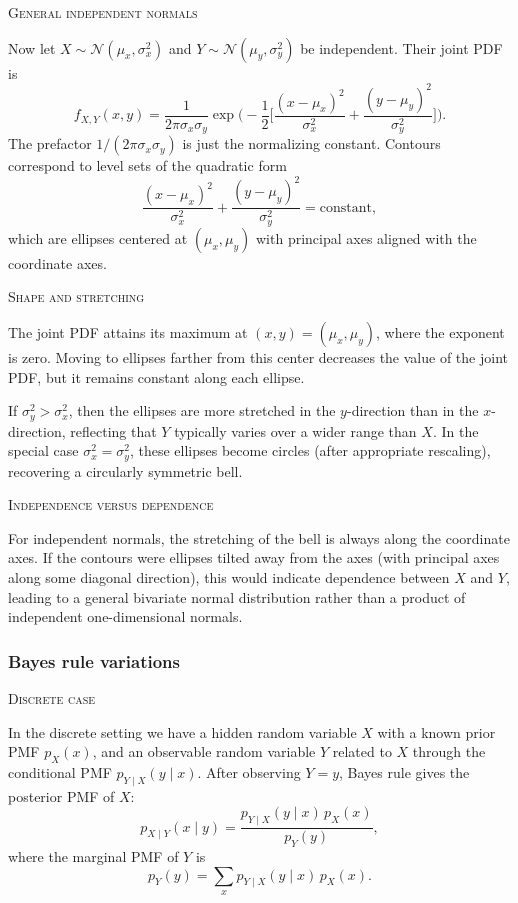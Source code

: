 \textsc{General independent normals}

Now let \(X\sim\mathcal{N}(\mu_{x},\sigma_{x}^{2})\) and \(Y\sim\mathcal{N}(\mu_{y},\sigma_{y}^{2})\) be independent.  
Their joint PDF is
\[
f_{X,Y}(x,y)
=
\frac{1}{2\pi\sigma_{x}\sigma_{y}}
\exp\!\Bigg(
-\frac{1}{2}\Bigg[
\frac{(x-\mu_{x})^{2}}{\sigma_{x}^{2}}
+
\frac{(y-\mu_{y})^{2}}{\sigma_{y}^{2}}
\Bigg]
\Bigg).
\]
The prefactor \(1/(2\pi\sigma_{x}\sigma_{y})\) is just the normalizing constant.  
Contours correspond to level sets of the quadratic form
\[
\frac{(x-\mu_{x})^{2}}{\sigma_{x}^{2}}
+
\frac{(y-\mu_{y})^{2}}{\sigma_{y}^{2}}
=
\text{constant},
\]
which are ellipses centered at \((\mu_{x},\mu_{y})\) with principal axes aligned with the coordinate axes.

\textsc{Shape and stretching}

The joint PDF attains its maximum at \((x,y)=(\mu_{x},\mu_{y})\), where the exponent is zero.  
Moving to ellipses farther from this center decreases the value of the joint PDF, but it remains constant along each ellipse.

If \(\sigma_{y}^{2} > \sigma_{x}^{2}\), then the ellipses are more stretched in the \(y\)-direction than in the \(x\)-direction, reflecting that \(Y\) typically varies over a wider range than \(X\).  
In the special case \(\sigma_{x}^{2} = \sigma_{y}^{2}\), these ellipses become circles (after appropriate rescaling), recovering a circularly symmetric bell.

\textsc{Independence versus dependence}

For independent normals, the stretching of the bell is always along the coordinate axes.  
If the contours were ellipses tilted away from the axes (with principal axes along some diagonal direction), this would indicate dependence between \(X\) and \(Y\), leading to a general bivariate normal distribution rather than a product of independent one-dimensional normals.

\subsubsection{Bayes rule variations}

\textsc{Discrete case}

In the discrete setting we have a hidden random variable \(X\) with a known prior PMF \(p_X(x)\), and an observable random variable \(Y\) related to \(X\) through the conditional PMF \(p_{Y\mid X}(y\mid x)\).  
After observing \(Y=y\), Bayes rule gives the posterior PMF of \(X\):
\[
p_{X\mid Y}(x\mid y)
=
\frac{p_{Y\mid X}(y\mid x)\,p_X(x)}{p_Y(y)},
\]
where the marginal PMF of \(Y\) is
\[
p_Y(y)
=
\sum_{x} p_{Y\mid X}(y\mid x)\,p_X(x).
\]


